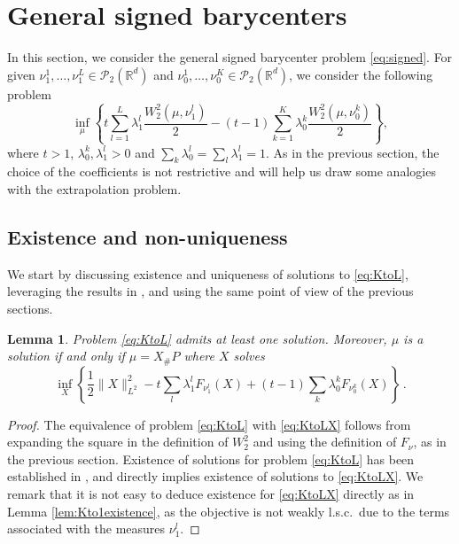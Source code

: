\documentclass[12pt]{amsart}
\numberwithin{equation}{section}
\let\mc=\mathcal
\theoremstyle{plain}
\newtheorem{lemma}[theorem]{Lemma}
\theoremstyle{definition}
\begin{document}
\section{General signed barycenters}\label{sec:general}

In this section, we consider the general signed barycenter problem \eqref{eq:signed}. For given $\nu_1^1,\ldots,\nu_1^L \in \mc{P}_2(\mathbb{R}^d)$ and $\nu_0^1, \ldots, \nu_0^K \in \mc{P}_2(\mathbb{R}^d)$, we consider the following problem
\begin{equation}\label{eq:KtoL}
\inf_\mu \left\{ t \sum_{l=1}^L\lambda_1^l\frac{W^2_2(\mu,\nu_1^l)}{2} - (t-1) \sum_{k=1}^K \lambda_0^k \frac{W^2_2(\mu,\nu_0^k)}{2} \right\},
\end{equation}
where $t>1$, $\lambda_0^k,\lambda_1^l>0$ and $\sum_k \lambda_0^l=\sum_l \lambda_1^l =1$. As in the previous section, the choice of the coefficients is not restrictive and will help us draw some analogies with the extrapolation problem. 

\subsection{Existence and non-uniqueness} We start by discussing existence and uniqueness of solutions to \eqref{eq:KtoL}, leveraging the results in \cite{tornabene2024generalized}, and using the same 
point of view of the previous sections. 

\begin{lemma} \label{lem:KtoLexistence} Problem \eqref{eq:KtoL} admits at least one solution. Moreover, $\mu$ is a solution if and only if $\mu = X_\# P$ where $X$ solves
\begin{equation}\label{eq:KtoLX}
\inf_{X} \left\{ \frac{1}{2} \|X\|^2_{L^2} -t \sum_l \lambda_1^l F_{\nu_1^l}(X)  + (t-1) \sum_{k}\lambda_0^k F_{\nu_0^k}(X) \right\}\,.
\end{equation}
\end{lemma}
\begin{proof} The equivalence of problem \eqref{eq:KtoL} with \eqref{eq:KtoLX} follows from expanding the square in the definition of $W_2^2$ and using the definition of $F_\nu$, as in the previous section. 
Existence of solutions for problem \eqref{eq:KtoL} has been established in \cite[Theorem 1.1]{tornabene2024generalized}, and directly implies existence of solutions to \eqref{eq:KtoLX}. We remark that it is not easy to deduce existence for \eqref{eq:KtoLX} directly as in Lemma \ref{lem:Kto1existence}, as the objective is not weakly l.s.c.\ due to the terms associated with the measures $\nu_1^l$.
\end{proof}
\end{document}
